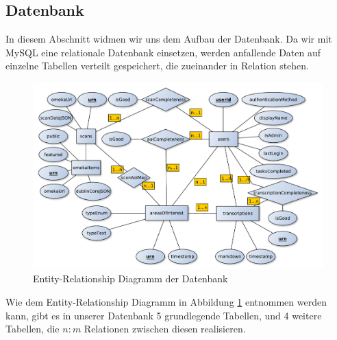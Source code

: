 \documentclass{article}
\begin{document}
\subsection{Datenbank}
In diesem Abschnitt widmen wir uns dem Aufbau der Datenbank.
Da wir mit MySQL eine relationale Datenbank einsetzen,
werden anfallende Daten auf einzelne Tabellen verteilt gespeichert,
die zueinander in Relation stehen.
\begin{figure}[H]
\includegraphics[width=\textwidth]{../notes/ER.pdf}
\caption{Entity-Relationship Diagramm der Datenbank}
\label{fig:er}
\end{figure}
Wie dem Entity-Relationship Diagramm in Abbildung \ref{fig:er} entnommen werden kann,
gibt es in unserer Datenbank 5 grundlegende Tabellen,
und 4 weitere Tabellen,
die $n:m$ Relationen zwischen diesen realisieren.
\end{document}

